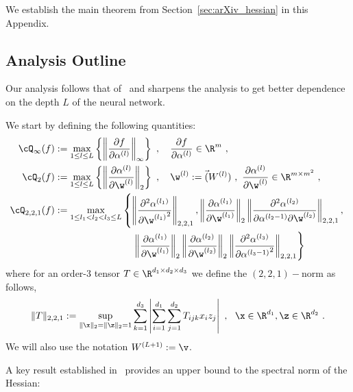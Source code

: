 
We establish the main theorem from Section~\ref{sec:arXiv_hessian} in this Appendix.

\boundhess*



\subsection{Analysis Outline}
%
Our analysis follows that of~\cite{CL-LZ-MB:20} and sharpens the analysis to get better dependence on the depth $L$ of the neural network.

We start by defining the following quantities:
\begin{align}
\cQ_\infty(f) & := \max_{1\leq l \leq L} \left\{ \left\| \frac{\partial f}{\partial \alpha^{(l)}} \right\|_{\infty} \right\}~,~~~  \frac{\partial f}{\partial \alpha^{(l)}} \in \R^m~,\\
\cQ_2(f) & := \max_{1\leq l \leq L} \left\{ \left\| \frac{\partial \alpha^{(l)}}{\partial \w^{(l)}} \right\|_2 \right\}~, ~~~\w^{(l)} := \vec(W^{(l)})~, ~ \frac{\partial \alpha^{(l)}}{\partial \w^{(l)}} \in \R^{m \times m^2}~,\\
\cQ_{2,2,1}(f) & := \max_{1\leq l_1 < l_2 < l_3  \leq L} \left\{ \left\| \frac{\partial^2 \alpha^{(l_1)}}{\partial {\w^{(l_1)}}^2} \right\|_{2,2,1}, 
\left\| \frac{\partial \alpha^{(l_1)}}{\partial \w^{(l_1)}} \right\|_2 \left\| \frac{\partial^2 \alpha^{(l_2)}}{\partial \alpha^{(l_2-1)} \partial \w^{(l_2)}} \right\|_{2,2,1}, \right.\\
& \phantom{\max_{1\leq l_1 < l_2 < l_3  \leq L} ......... } \left. 
\left\| \frac{\partial \alpha^{(l_1)}}{\partial \w^{(l_1)}} \right\|_2 \left\| \frac{\partial \alpha^{(l_2)}}{\partial \w^{(l_2)}} \right\|_2 \left\| \frac{\partial^2 \alpha^{(l_3)}}{\partial {\alpha^{(l_3-1)}}^2 } \right\|_{2,2,1}
\right\}
\end{align}
where for an order-3 tensor $T \in \R^{d_1 \times d_2 \times d_3}$ we define the $(2,2,1)-$norm as follows, 
\begin{align}
\| T \|_{2,2,1} := \sup_{\|\x\|_2 = \|\z\|_2 = 1} \sum_{k=1}^{d_3} \left| \sum_{i=1}^{d_1} \sum_{j=1}^{d_2} T_{ijk} x_i z_j \right|~,~~\x \in \R^{d_1}, \z \in \R^{d_2}~.
\label{eq:norm-221}
\end{align}
We will also use the notation $W^{(L+1)}:=\v$.

A key result established in~\cite{CL-LZ-MB:20} provides an upper bound to the spectral norm of the Hessian:
\lzbhess*

